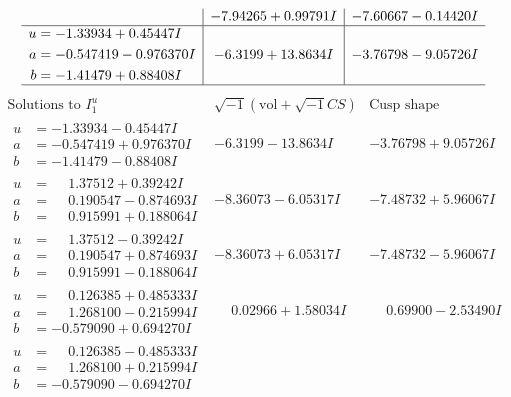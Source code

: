 \documentclass[1p]{elsarticle_modified}
\theoremstyle{definition}
\newcommand{\I}{\sqrt{-1}}
\begin{document}
$$\begin{array}{c|c|c}
 & -7.94265 + 0.99791 I & -7.60667 - 0.14420 I \\ \hline\begin{aligned}
u &= -1.33934 + 0.45447 I \\
a &= -0.547419 - 0.976370 I \\
b &= -1.41479 + 0.88408 I\end{aligned}
 & -6.3199 + 13.8634 I & -3.76798 - 9.05726 I\\
 \hline 
 \end{array}$$\newpage$$\begin{array}{c|c|c}  
\text{Solutions to }I^u_{1}& \I (\text{vol} + \sqrt{-1}CS) & \text{Cusp shape}\\
 \hline 
\begin{aligned}
u &= -1.33934 - 0.45447 I \\
a &= -0.547419 + 0.976370 I \\
b &= -1.41479 - 0.88408 I\end{aligned}
 & -6.3199 - 13.8634 I & -3.76798 + 9.05726 I \\ \hline\begin{aligned}
u &= \phantom{-}1.37512 + 0.39242 I \\
a &= \phantom{-}0.190547 - 0.874693 I \\
b &= \phantom{-}0.915991 + 0.188064 I\end{aligned}
 & -8.36073 - 6.05317 I & -7.48732 + 5.96067 I \\ \hline\begin{aligned}
u &= \phantom{-}1.37512 - 0.39242 I \\
a &= \phantom{-}0.190547 + 0.874693 I \\
b &= \phantom{-}0.915991 - 0.188064 I\end{aligned}
 & -8.36073 + 6.05317 I & -7.48732 - 5.96067 I \\ \hline\begin{aligned}
u &= \phantom{-}0.126385 + 0.485333 I \\
a &= \phantom{-}1.268100 - 0.215994 I \\
b &= -0.579090 + 0.694270 I\end{aligned}
 & \phantom{-}0.02966 + 1.58034 I & \phantom{-}0.69900 - 2.53490 I \\ \hline\begin{aligned}
u &= \phantom{-}0.126385 - 0.485333 I \\
a &= \phantom{-}1.268100 + 0.215994 I \\
b &= -0.579090 - 0.694270 I\end{aligned}

\end{array}$$
\end{document}
